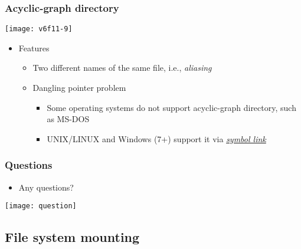 \documentclass[CJKutf8,xcolor=pdftex,dvipsnames,table]{beamer}
\begin{document}
\begin{CJK*}{UTF8}{song}
  \begin{frame}
    \frametitle{Acyclic-graph directory} \pause
    \begin{center}
      \texttt{[image: v6f11-9]} \pause
    \end{center}
    \begin{itemize}
    \item Features \pause
      \begin{itemize}
      \item Two different names of the same file, i.e., \emph{aliasing} \pause
      \item Dangling pointer problem \pause
        \begin{itemize}
        \item Some operating systems do not support acyclic-graph directory, such as MS-DOS \pause
        \item UNIX/LINUX and Windows (7+) support it via \href{https://en.wikipedia.org/wiki/Symbolic\_link}{\emph{symbol link}}
        \end{itemize}
      \end{itemize}
    \end{itemize}
  \end{frame}

  \begin{frame}
    \frametitle{Questions}
    \begin{itemize}
    \item Any questions?
    \end{itemize}
    \begin{center}
      \texttt{[image: question]}
    \end{center}
  \end{frame}

  \subsection{File system mounting}


\end{CJK*}
\end{document}
